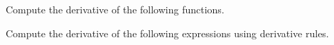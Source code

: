 \begin{questions}
\question Compute the derivative of the following functions.
\begin{multicols}{3}

\end{multicols}

\question Compute the derivative of the following expressions using derivative rules.
\begin{multicols}{2}
\begin{parts}

\end{parts}
\end{multicols}
\end{questions}

